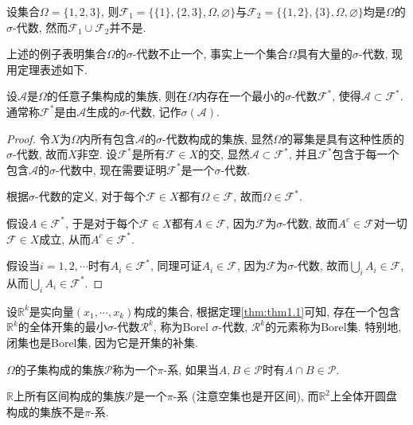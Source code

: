 \documentclass[cn, 12pt, math=mtpro2, bibstyle=apa, blue, twocol]{elegantbook}
\newcommand{\F}{\mathcal{F}}
\newcommand{\R}{\mathbb{R}}
\let\emptyset\varnothing
\begin{document}
\begin{example}
设集合$\Omega=\{1,2,3\}$, 则$\F_1=\{\{1\},\{2,3\},\Omega,\emptyset\}$与$\F_2=\{\{1,2\},\{3\},\Omega,\emptyset\}$均是$\Omega$的$\sigma$-代数, 然而$\F_1\cup\F_2$并不是.
\end{example}
上述的例子表明集合$\Omega$的$\sigma$-代数不止一个, 事实上一个集合$\Omega$具有大量的$\sigma$-代数, 现用定理表述如下.
\begin{theorem}\label{thm:thm1.1}
  设$\mathcal{A}$是$\Omega$的任意子集构成的集族, 则在$\Omega$内存在一个最小的$\sigma$-代数$\F^\ast$, 使得$\mathcal{A}\subset\F^\ast$. 通常称$\F^\ast$是由$\mathcal{A}$生成的$\sigma$-代数, 记作$\sigma(\mathcal{A})$.
\end{theorem}
\begin{proof}
  令$X$为$\Omega$内所有包含$\mathcal{A}$的$\sigma$-代数构成的集族, 显然$\Omega$的幂集是具有这种性质的$\sigma$-代数, 故而$X$非空. 设$\F^\ast$是所有$\F\in X$的交, 显然$\mathcal{A}\subset\F^\ast$, 并且$\F^\ast$包含于每一个包含$\mathcal{A}$的$\sigma$-代数中, 现在需要证明$\F^\ast$是一个$\sigma$-代数.

  根据$\sigma$-代数的定义, 对于每个$\F\in X$都有$\Omega\in \F$, 故而$\Omega\in\F^\ast$.

  假设$A\in\F^\ast$, 于是对于每个$\F\in X$都有$A\in\F$, 因为$\F$为$\sigma$-代数, 故而$A^c\in\F$对一切$\F\in X$成立, 从而$A^c\in\F^\ast$.

  假设当$i=1,2,\cdots$时有$A_i\in\F^\ast$, 同理可证$A_i\in\F$, 因为$\F$为$\sigma$-代数, 故而$\bigcup_i A_i\in \F$, 从而$\bigcup_i A_i\in\F^\ast$.
\end{proof}

设$\R^k$是实向量$(x_1,\cdots,x_k)$构成的集合, 根据定理\ref{thm:thm1.1}可知, 存在一个包含$\R^k$的全体开集的最小$\sigma$-代数$\mathcal{R}^k$, 称为Borel $\sigma$-代数, $\mathcal{R}^k$的元素称为Borel集. 特别地, 闭集也是Borel集, 因为它是开集的补集.

\begin{definition}
$\Omega$的子集构成的集族$\mathcal{P}$称为一个$\pi$-系, 如果当$A,B\in\mathcal{P}$时有$A\cap B\in\mathcal{P}$.
\end{definition}

\begin{example}
$\R$上所有区间构成的集族$\mathcal{P}$是一个$\pi$-系 (注意空集也是开区间), 而$\R^2$上全体开圆盘构成的集族不是$\pi$-系.
\end{example}
\end{document}
